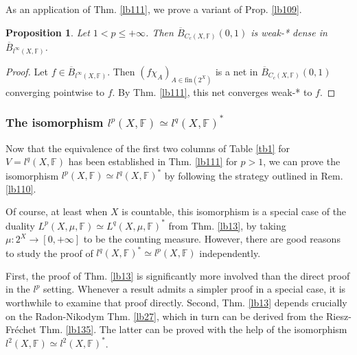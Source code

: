 \documentclass[12pt,b5paper,notitlepage]{article}
\theoremstyle{definition}
\theoremstyle{plain}
\newtheorem{pp}[df]{Proposition}
\newcommand{\ovl}{\overline}
\newcommand{\fin}{\mathrm{fin}}
\newcommand{\Fbb}{\mathbb F}
\numberwithin{equation}{section}
\begin{document}
As an application of Thm. \ref{lb111}, we prove a variant of Prop. \ref{lb109}.

\begin{pp}
Let $1<p\leq+\infty$. Then $\ovl B_{C_c(X,\Fbb)}(0,1)$ is weak-* dense in $\ovl B_{l^\infty(X,\Fbb)}$.
\end{pp}


\begin{proof}
Let $f\in \ovl B_{l^\infty(X,\Fbb)}$. Then $(f\chi_A)_{A\in\fin(2^X)}$ is a net in $\ovl B_{C_c(X,\Fbb)}(0,1)$ converging pointwise to $f$. By Thm. \ref{lb111}, this net converges weak-* to $f$. 
\end{proof}


\subsubsection{The isomorphism $l^p(X,\Fbb)\simeq l^q(X,\Fbb)^*$}


Now that the equivalence of the first two columns of Table \ref{tb1} for $V=l^q(X,\Fbb)$ has been established in Thm. \ref{lb111} for $p>1$, we can prove the isomorphism $l^p(X,\Fbb)\simeq l^q(X,\Fbb)^*$ by following the strategy outlined in Rem. \ref{lb110}. 

Of course, at least when $X$ is countable, this isomorphism is a special case of the duality $L^p(X,\mu,\Fbb)\simeq L^q(X,\mu,\Fbb)^*$ from Thm. \ref{lb13}, by taking $\mu:2^X\rightarrow[0,+\infty]$ to be the counting measure. However, there are good reasons to study the proof of $l^q(X,\Fbb)^*\simeq l^p(X,\Fbb)$ independently. 

First, the proof of Thm. \ref{lb13} is significantly more involved than the direct proof in the $l^p$ setting. Whenever a result admits a simpler proof in a special case, it is worthwhile to examine that proof directly. Second, Thm. \ref{lb13} depends crucially on the Radon-Nikodym Thm. \ref{lb27}, which in turn can be derived from the Riesz-Fr\'echet Thm. \ref{lb135}. The latter can be proved with the help of the isomorphism $l^2(X,\Fbb)\simeq l^2(X,\Fbb)^*$. 



\end{document}
